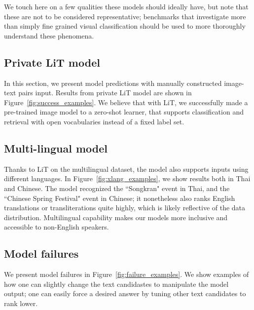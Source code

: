\documentclass[10pt,twocolumn,letterpaper]{article}
\begin{document}
We touch here on a few qualities these models should ideally have, but note that these are not to be considered representative; benchmarks that investigate more than simply fine grained visual classification should be used to more thoroughly understand these phenomena.

\subsection{Private LiT model}
In this section, we present model predictions with manually constructed image-text pairs input. Results from private LiT model are shown in Figure~\ref{fig:success_examples}. We believe that with LiT, we successfully made a pre-trained image model to a zero-shot learner, that supports classification and retrieval with open vocabularies instead of a fixed label set. 


\subsection{Multi-lingual model}
Thanks to LiT on the multilingual dataset, the model also supports inputs using different languages. In Figure~\ref{fig:xlang_examples}, we show results both in Thai and Chinese. The model recognized the “Songkran" event in Thai, and the “Chinese Spring Festival" event in Chinese; it nonetheless also ranks English translations or transliterations quite highly, which is likely reflective of the data distribution. 
Multilingual capability makes our models more inclusive and accessible to non-English speakers.


\subsection{Model failures}
We present model failures in Figure~\ref{fig:failure_examples}. We show examples of how one can slightly change the text candidastes to manipulate the model output; one can easily force a desired answer by tuning other text candidates to rank lower.
\end{document}
